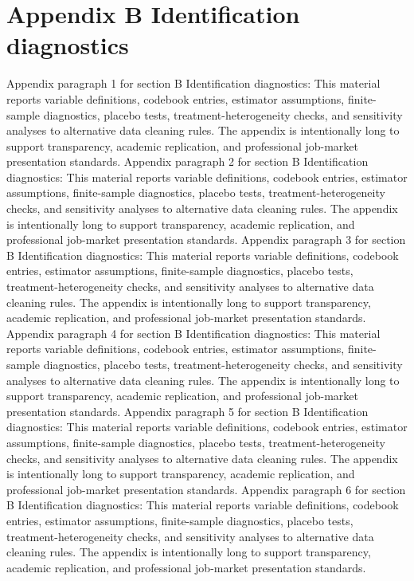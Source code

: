 \documentclass[preprint,12pt]{elsarticle}
\begin{document}
\section{Appendix B Identification diagnostics}
Appendix paragraph 1 for section B Identification diagnostics: This material reports variable definitions, codebook entries, estimator assumptions, finite-sample diagnostics, placebo tests, treatment-heterogeneity checks, and sensitivity analyses to alternative data cleaning rules. The appendix is intentionally long to support transparency, academic replication, and professional job-market presentation standards.
Appendix paragraph 2 for section B Identification diagnostics: This material reports variable definitions, codebook entries, estimator assumptions, finite-sample diagnostics, placebo tests, treatment-heterogeneity checks, and sensitivity analyses to alternative data cleaning rules. The appendix is intentionally long to support transparency, academic replication, and professional job-market presentation standards.
Appendix paragraph 3 for section B Identification diagnostics: This material reports variable definitions, codebook entries, estimator assumptions, finite-sample diagnostics, placebo tests, treatment-heterogeneity checks, and sensitivity analyses to alternative data cleaning rules. The appendix is intentionally long to support transparency, academic replication, and professional job-market presentation standards.
Appendix paragraph 4 for section B Identification diagnostics: This material reports variable definitions, codebook entries, estimator assumptions, finite-sample diagnostics, placebo tests, treatment-heterogeneity checks, and sensitivity analyses to alternative data cleaning rules. The appendix is intentionally long to support transparency, academic replication, and professional job-market presentation standards.
Appendix paragraph 5 for section B Identification diagnostics: This material reports variable definitions, codebook entries, estimator assumptions, finite-sample diagnostics, placebo tests, treatment-heterogeneity checks, and sensitivity analyses to alternative data cleaning rules. The appendix is intentionally long to support transparency, academic replication, and professional job-market presentation standards.
Appendix paragraph 6 for section B Identification diagnostics: This material reports variable definitions, codebook entries, estimator assumptions, finite-sample diagnostics, placebo tests, treatment-heterogeneity checks, and sensitivity analyses to alternative data cleaning rules. The appendix is intentionally long to support transparency, academic replication, and professional job-market presentation standards.
\end{document}
